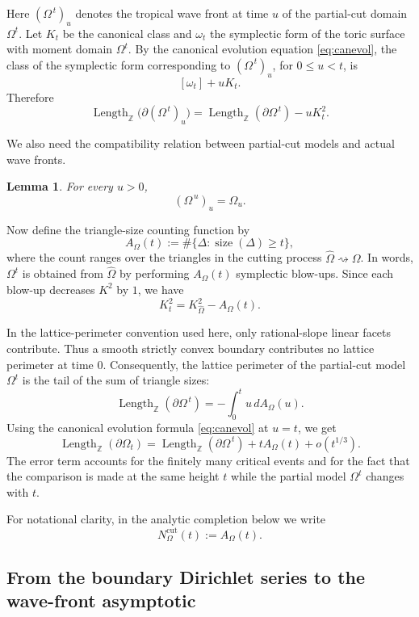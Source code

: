 \documentclass[a4paper,american,11pt]{amsart}
\theoremstyle{plain}
\newtheorem{lemma}[theorem]{Lemma}
\theoremstyle{definition}
\newcommand{\Z}{\mathbb Z}
\DeclareMathOperator{\Length}{Length}
\begin{document}
Here \((\Omega^{\,t})_u\) denotes the tropical wave front at time \(u\) of the
partial-cut domain \(\Omega^t\).  Let \(K_t\) be the canonical class and
\(\omega_t\) the symplectic form of the toric surface with moment domain
\(\Omega^t\).  By the canonical evolution equation \eqref{eq:canevol}, the
class of the symplectic form corresponding to \((\Omega^{\,t})_u\), for
\(0\le u<t\), is
\[
[\omega_t]+uK_t.
\]
Therefore
\[
\Length_{\Z}\bigl(\partial(\Omega^{\,t})_u\bigr)
=
\Length_{\Z}(\partial\Omega^{\,t})-uK_t^2.
\]

We also need the compatibility relation between partial-cut models and
actual wave fronts.

\begin{lemma}
For every \(u>0\),
\[
(\Omega^{\,u})_u=\Omega_u.
\]
\end{lemma}

Now define the triangle-size counting function by
\[
A_\Omega(t):=
\#\{\Delta:\operatorname{size}(\Delta)\ge t\},
\]
where the count ranges over the triangles in the cutting process
\(\widehat\Omega\rightsquigarrow\Omega\).  In words, \(\Omega^t\) is obtained
from \(\widehat\Omega\) by performing \(A_\Omega(t)\) symplectic blow-ups.
Since each blow-up decreases \(K^2\) by \(1\), we have
\[
K_t^2=K_{\widehat\Omega}^2-A_\Omega(t).
\]

In the lattice-perimeter convention used here, only rational-slope linear
facets contribute.  Thus a smooth strictly convex boundary contributes no
lattice perimeter at time \(0\).  Consequently, the lattice perimeter of the
partial-cut model \(\Omega^t\) is the tail of the sum of triangle sizes:
\[
\Length_{\Z}(\partial\Omega^{\,t})
=
-\int_0^t u\,dA_\Omega(u).
\]
Using the canonical evolution formula \eqref{eq:canevol} at \(u=t\), we get
\[
\Length_{\Z}(\partial\Omega_t)
=
\Length_{\Z}(\partial\Omega^{\,t})
+
tA_\Omega(t)
+
o(t^{1/3}).
\]
The error term accounts for the finitely many critical events and for the
fact that the comparison is made at the same height \(t\) while the partial
model \(\Omega^t\) changes with \(t\).

For notational clarity, in the analytic completion below we write
\[
N^{\mathrm{cut}}_\Omega(t):=A_\Omega(t).
\]

\subsection{From the boundary Dirichlet series to the wave-front asymptotic}
\label{ssec:analyticcompletion}
\end{document}
